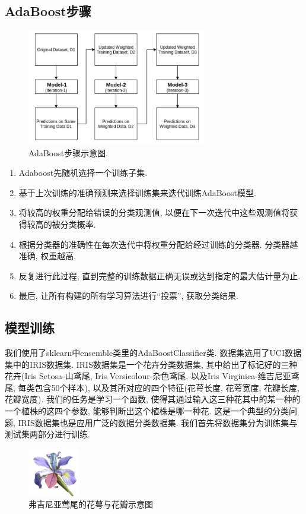 \documentclass[lang=cn,11pt]{elegantpaper}
\begin{document}
\subsection{AdaBoost步骤}
\begin{figure}[htbp]
  \centering
  \includegraphics[width=0.7\textwidth]{3}
  \caption{AdaBoost步骤示意图.}
\end{figure}
\begin{enumerate}
  \item Adaboost先随机选择一个训练子集. 
  \item 基于上次训练的准确预测来选择训练集来迭代训练AdaBoost模型. 
  \item 将较高的权重分配给错误的分类观测值, 以便在下一次迭代中这些观测值将获得较高的被分类概率. 
  \item 根据分类器的准确性在每次迭代中将权重分配给经过训练的分类器. 分类器越准确, 权重越高. 
  \item 反复进行此过程, 直到完整的训练数据正确无误或达到指定的最大估计量为止. 
  \item 最后, 让所有构建的所有学习算法进行“投票”, 获取分类结果.   
\end{enumerate}
\subsection{模型训练}
我们使用了sklearn中ensemble类里的AdaBoostClassifier类. 数据集选用了UCI数据集中的IRIS数据集. IRIS数据集是一个花卉分类数据集, 其中给出了标记好的三种花卉(Iris Setosa-山鸢尾, Iris Versicolour-杂色鸢尾, 以及Iris Virginica-维吉尼亚鸢尾, 每类包含50个样本), 以及其所对应的四个特征(花萼长度, 花萼宽度, 花瓣长度, 花瓣宽度). 我们的任务是学习一个函数, 使得其通过输入这三种花其中的某一种的一个植株的这四个参数, 能够判断出这个植株是哪一种花. 这是一个典型的分类问题, IRIS数据集也是应用广泛的数据分类数据集. 我们首先将数据集分为训练集与测试集两部分进行训练.

\begin{figure}[htbp]
\centering
  \includegraphics[width=0.2\textwidth]{flower.png}
  \caption{弗吉尼亚莺尾的花萼与花瓣示意图\label{fig:VGflower}}
\end{figure}
\end{document}
